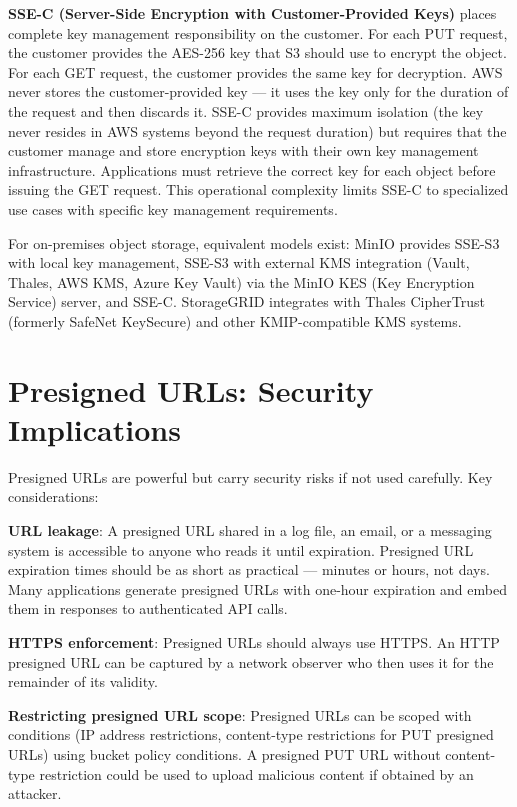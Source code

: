 \textbf{SSE-C (Server-Side Encryption with Customer-Provided Keys)} places complete key management responsibility on the customer. For each PUT request, the customer provides the AES-256 key that S3 should use to encrypt the object. For each GET request, the customer provides the same key for decryption. AWS never stores the customer-provided key --- it uses the key only for the duration of the request and then discards it. SSE-C provides maximum isolation (the key never resides in AWS systems beyond the request duration) but requires that the customer manage and store encryption keys with their own key management infrastructure. Applications must retrieve the correct key for each object before issuing the GET request. This operational complexity limits SSE-C to specialized use cases with specific key management requirements.

For on-premises object storage, equivalent models exist: MinIO provides SSE-S3 with local key management, SSE-S3 with external KMS integration (Vault, Thales, AWS KMS, Azure Key Vault) via the MinIO KES (Key Encryption Service) server, and SSE-C. StorageGRID integrates with Thales CipherTrust (formerly SafeNet KeySecure) and other KMIP-compatible KMS systems.

\section{Presigned URLs: Security Implications}
Presigned URLs are powerful but carry security risks if not used carefully. Key considerations:

\textbf{URL leakage}: A presigned URL shared in a log file, an email, or a messaging system is accessible to anyone who reads it until expiration. Presigned URL expiration times should be as short as practical --- minutes or hours, not days. Many applications generate presigned URLs with one-hour expiration and embed them in responses to authenticated API calls.

\textbf{HTTPS enforcement}: Presigned URLs should always use HTTPS. An HTTP presigned URL can be captured by a network observer who then uses it for the remainder of its validity.

\textbf{Restricting presigned URL scope}: Presigned URLs can be scoped with conditions (IP address restrictions, content-type restrictions for PUT presigned URLs) using bucket policy conditions. A presigned PUT URL without content-type restriction could be used to upload malicious content if obtained by an attacker.

